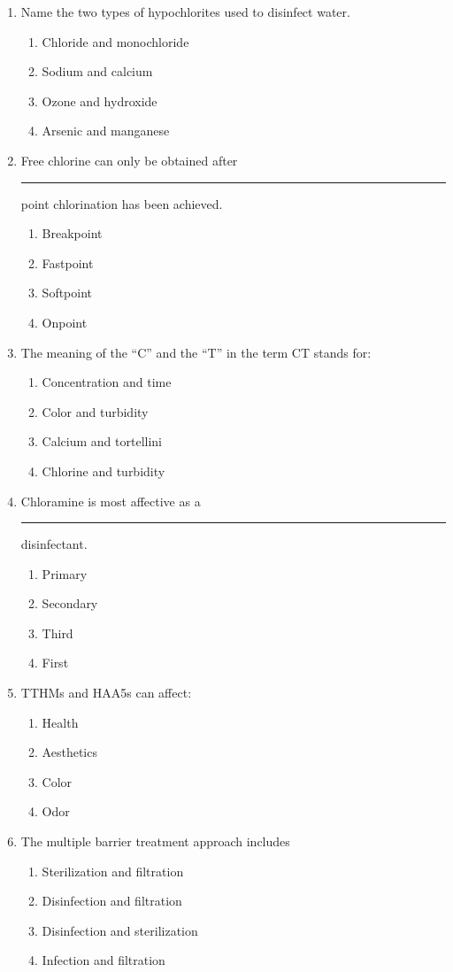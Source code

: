 \begin{enumerate}
\item Name the two types of hypochlorites used to disinfect water.
\begin{enumerate}
\item Chloride and monochloride
\item Sodium and calcium
\item Ozone and hydroxide
\item Arsenic and manganese
\end{enumerate}

\item Free chlorine can only be obtained after \rule{1cm}{0.5pt}  point chlorination has been achieved.
\begin{enumerate}
\item Breakpoint
\item Fastpoint
\item Softpoint
\item Onpoint
\end{enumerate}

\item The meaning of the “C” and the “T” in the term CT stands for:
\begin{enumerate}
\item Concentration and time
\item Color and turbidity
\item Calcium and tortellini
\item Chlorine and turbidity
\end{enumerate}

\item Chloramine is most affective as a \rule{1cm}{0.5pt} disinfectant.
\begin{enumerate}
\item Primary
\item Secondary
\item Third
\item First
\end{enumerate}

\item TTHMs and HAA5s can affect:
\begin{enumerate}
\item Health
\item Aesthetics
\item Color
\item Odor
\end{enumerate}

\item  The multiple barrier treatment approach includes\\
\begin{enumerate}
\item Sterilization and filtration\\
\item Disinfection and filtration\\
\item Disinfection and sterilization\\
\item Infection and filtration
\end{enumerate}


\end{enumerate}
